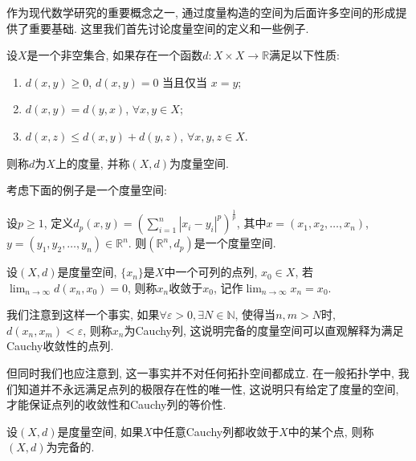 \documentclass[theorem=false,mathfont=none,openany,sub3section]{easybook}
\begin{document}
作为现代数学研究的重要概念之一, 通过度量构造的空间为后面许多空间的形成提供了重要基础. 这里我们首先讨论度量空间的定义和一些例子.\par

\begin{definition}
  设$X$是一个非空集合, 如果存在一个函数$d: X \times X \to \mathbb{R}$满足以下性质:\par
  \begin{enumerate}
    \item $d(x, y) \geq 0$, $d(x, y) = 0$ 当且仅当 $x = y$;
    \item $d(x, y) = d(y, x)$, $\forall x, y \in X$;
    \item $d(x, z) \leq d(x, y) + d(y, z)$, $\forall x, y, z \in X$.
  \end{enumerate}
  则称$d$为$X$上的度量, 并称$(X, d)$为度量空间.\par
\end{definition}

考虑下面的例子是一个度量空间:\par

\begin{example}
  设$p\geqslant 1$, 定义$d_p(x,y) = \left( \sum_{i=1}^{n} |x_i - y_i|^p \right)^{\frac{1}{p}}$, 其中$x = (x_1, x_2, \ldots, x_n)$, $y = (y_1, y_2, \ldots, y_n) \in \mathbb{R}^n$. 则$(\mathbb{R}^n, d_p)$是一个度量空间.\par
\end{example}

\begin{definition}
  设$(X,d)$是度量空间, $\{x_n\}$是$X$中一个可列的点列, $x_0 \in X$, 若$\lim_{n \to \infty} d(x_n, x_0) = 0$, 则称$x_n$收敛于$x_0$, 记作$\lim_{n \to \infty}x_n = x_0$.\par
\end{definition}

\begin{remark}
  我们注意到这样一个事实, 如果$\forall \varepsilon >0, \exists N \in \mathbb{N}$, 使得当$n,m  > N$时, $d(x_n, x_m) < \varepsilon$, 则称$x_n$为Cauchy列, 这说明完备的度量空间可以直观解释为满足Cauchy收敛性的点列.\par
  但同时我们也应注意到, 这一事实并不对任何拓扑空间都成立. 在一般拓扑学中, 我们知道并不永远满足点列的极限存在性的唯一性, 这说明只有给定了度量的空间, 才能保证点列的收敛性和Cauchy列的等价性.\par
\end{remark}

\begin{definition}
  设$(X,d)$是度量空间, 如果$X$中任意Cauchy列都收敛于$X$中的某个点, 则称$(X,d)$为完备的.\par
\end{definition}
\end{document}
